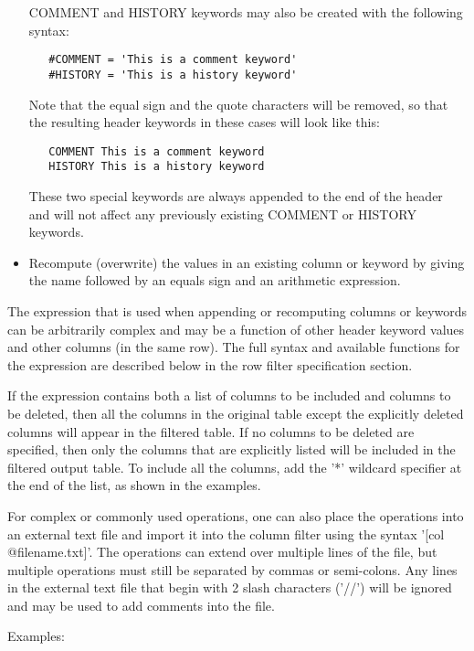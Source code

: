 \documentclass[11pt]{book}
\begin{document}
\begin{itemize}
COMMENT and HISTORY keywords may also be created with the following syntax:

\begin{verbatim}
   #COMMENT = 'This is a comment keyword'
   #HISTORY = 'This is a history keyword'
\end{verbatim}
Note that the equal sign and the quote characters will be removed, so
that the resulting header keywords in these cases will look like this:

\begin{verbatim}
   COMMENT This is a comment keyword
   HISTORY This is a history keyword
\end{verbatim}
These two special keywords are always appended to the end of the header
and will not affect any previously existing COMMENT or HISTORY keywords.

\item
Recompute (overwrite) the values in an existing column or keyword by
giving the name followed by an equals sign and an arithmetic
expression.
\end{itemize}

The expression that is used when appending or recomputing columns or
keywords can be arbitrarily complex and may be a function of other
header keyword values and other columns (in the same row).  The full
syntax and available functions for the expression are described below
in the row filter specification section.

If the expression contains both a list of columns to be included and
columns to be deleted, then all the columns in the original table
except the explicitly deleted columns will appear in the filtered
table.  If no columns to be deleted are specified, then only the
columns that are explicitly listed will be included in the filtered
output table.  To include all the columns, add the '*' wildcard
specifier at the end of the list, as shown in the examples.

For  complex  or commonly used operations,  one  can also  place the
operations into an external text  file and import it  into the  column
filter using  the syntax '[col @filename.txt]'.   The operations can
extend over multiple lines of the  file, but multiple operations must
still be separated by commas or semi-colons.   Any lines in the external text file
that begin with 2 slash characters ('//') will be ignored and may be
used to add comments into the file.

Examples:
\end{document}
